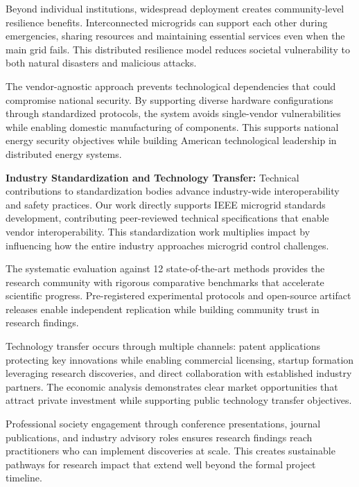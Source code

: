 \documentclass[12pt]{article}
\begin{document}
Beyond individual institutions, widespread deployment creates community-level resilience benefits. Interconnected microgrids can support each other during emergencies, sharing resources and maintaining essential services even when the main grid fails. This distributed resilience model reduces societal vulnerability to both natural disasters and malicious attacks.

The vendor-agnostic approach prevents technological dependencies that could compromise national security. By supporting diverse hardware configurations through standardized protocols, the system avoids single-vendor vulnerabilities while enabling domestic manufacturing of components. This supports national energy security objectives while building American technological leadership in distributed energy systems.

\textbf{Industry Standardization and Technology Transfer:} Technical contributions to standardization bodies advance industry-wide interoperability and safety practices. Our work directly supports IEEE microgrid standards development, contributing peer-reviewed technical specifications that enable vendor interoperability. This standardization work multiplies impact by influencing how the entire industry approaches microgrid control challenges.

The systematic evaluation against 12 state-of-the-art methods \cite{our2024comparative} provides the research community with rigorous comparative benchmarks that accelerate scientific progress. Pre-registered experimental protocols and open-source artifact releases enable independent replication while building community trust in research findings.

Technology transfer occurs through multiple channels: patent applications protecting key innovations while enabling commercial licensing, startup formation leveraging research discoveries, and direct collaboration with established industry partners. The economic analysis demonstrates clear market opportunities that attract private investment while supporting public technology transfer objectives.

Professional society engagement through conference presentations, journal publications, and industry advisory roles ensures research findings reach practitioners who can implement discoveries at scale. This creates sustainable pathways for research impact that extend well beyond the formal project timeline.



\end{document}
